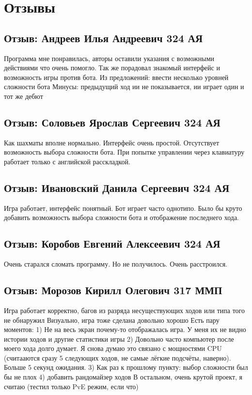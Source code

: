 \section{Отзывы}

\subsection{Отзыв: Андреев Илья Андреевич 324 АЯ}
Программа мне понравилась, авторы оставили указания с возможными действиями что очень помогло. Так же порадовал знакомый интерфейс и возможность игры против бота. 
Из предложений: ввести несколько уровней сложности бота
Минусы: предыдущий ход ии не показывается, ии играет один и тот же дебют

\subsection{Отзыв: Соловьев Ярослав Сергеевич 324 АЯ}
Как шахматы вполне нормально. Интерфейс очень простой. Отсутствует возможность выбора сложности бота. При попытке управлении через клавиатуру работает только с английской расскладкой.

\subsection{Отзыв: Ивановский Данила Сергеевич 324 АЯ}
Игра работает, интерфейс понятный. Бот играет часто однотипо. Было бы круто добавить возможность выбора сложности бота и отображение последнего хода.

\subsection{Отзыв: Коробов Евгений Алексеевич 324 АЯ}
Очень старался сломать программу. Но не получилось. Очень расстроился.

\subsection{Отзыв: Морозов Кирилл Олегович 317 ММП}
Игра работает корректно, багов  из разряда несуществующих ходов или типа того не обнаружил
Визуально, игра тоже сделана довольно хорошо
Есть пару моментов:
1) Не на весь экран почему-то отображалась игра. У меня их не видно истории ходов и другие статистики игры
2) Довольно часто компьютер после моего хода долго думает. Я снова думаю это связано с мощностями CPU (считааются сразу 5 следующих ходов, не самые лёгкие подсчёты, наверно). Больше 5 секунд ожидания.
3) Как раз к прошлому пункту: выбор сложности был бы не плох
4) добавить рандомайзер ходов
В остальном, очень крутой проект, я считаю (тестил только PvE режим, если что)

